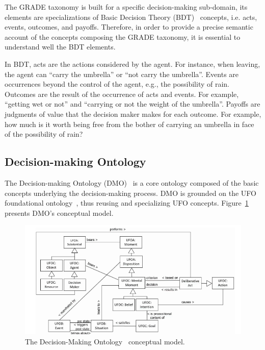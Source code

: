 The GRADE taxonomy is built for a specific decision-making sub-domain, its elements are specializations of Basic Decision Theory (BDT)~\cite{decision-theory} concepts, i.e. acts, events, outcomes, and payoffs. Therefore, in order to provide a precise semantic account of the concepts composing the GRADE taxonomy, it is essential to understand well the BDT elements.

In BDT, acts are the actions considered by the agent. For instance, when leaving, the agent can ``carry the umbrella'' or ``not carry the umbrella''. Events are occurrences beyond the control of the agent, e.g., the possibility of rain. Outcomes are the result of the occurrence of acts and events. For example, ``getting wet or not'' and ``carrying or not the weight of the umbrella''. Payoffs are judgments of value that the decision maker makes for each outcome. For example, how much is it worth being free from the bother of carrying an umbrella in face of the possibility of rain?


\subsection{Decision-making Ontology}
\label{subsec-decision-making}

The Decision-making Ontology (DMO)~\cite{guizzardi2018aligning} is a core ontology composed of the basic concepts underlying the decision-making process. DMO is grounded on the UFO foundational ontology~\cite{guizzardi:phdthesis05}, thus reusing and specializing UFO concepts. Figure~\ref{fig-decision-making-ontology} presents DMO's conceptual model.

\begin{figure}
	\centering
	\includegraphics[width=\textwidth]{figuras/fig-decision-making-ontology} 
	\caption{The Decision-Making Ontology~\cite{guizzardi2018aligning} conceptual model.}
	\label{fig-decision-making-ontology}
\end{figure}

